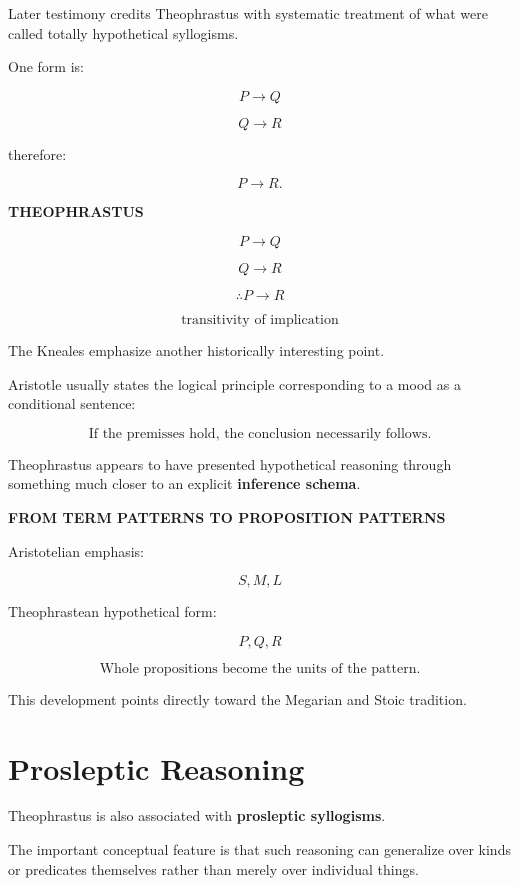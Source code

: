 \documentclass[11pt]{article}
\begin{document}
Later testimony credits Theophrastus with systematic treatment
of what were called totally hypothetical syllogisms.

One form is:

\[
P\rightarrow Q
\]

\[
Q\rightarrow R
\]

therefore:

\[
P\rightarrow R.
\]

\begin{whiteboard}
\textbf{THEOPHRASTUS}

\[
P\rightarrow Q
\]

\[
Q\rightarrow R
\]

\[
\therefore
P\rightarrow R
\]

\[
\boxed{\text{transitivity of implication}}
\]
\end{whiteboard}

The Kneales emphasize another historically interesting point.

Aristotle usually states the logical principle corresponding to a
mood as a conditional sentence:

\[
\text{If the premisses hold, the conclusion necessarily follows.}
\]

Theophrastus appears to have presented hypothetical reasoning
through something much closer to an explicit
\textbf{inference schema}.

\begin{whiteboard}
\textbf{FROM TERM PATTERNS TO PROPOSITION PATTERNS}

Aristotelian emphasis:

\[
S,M,L
\]

Theophrastean hypothetical form:

\[
P,Q,R
\]

\[
\boxed{\text{Whole propositions become the units of the pattern.}}
\]
\end{whiteboard}

This development points directly toward the Megarian and Stoic
tradition.

\section{Prosleptic Reasoning}

Theophrastus is also associated with
\textbf{prosleptic syllogisms}.

The important conceptual feature is that such reasoning can
generalize over kinds or predicates themselves rather than merely
over individual things.
\end{document}
